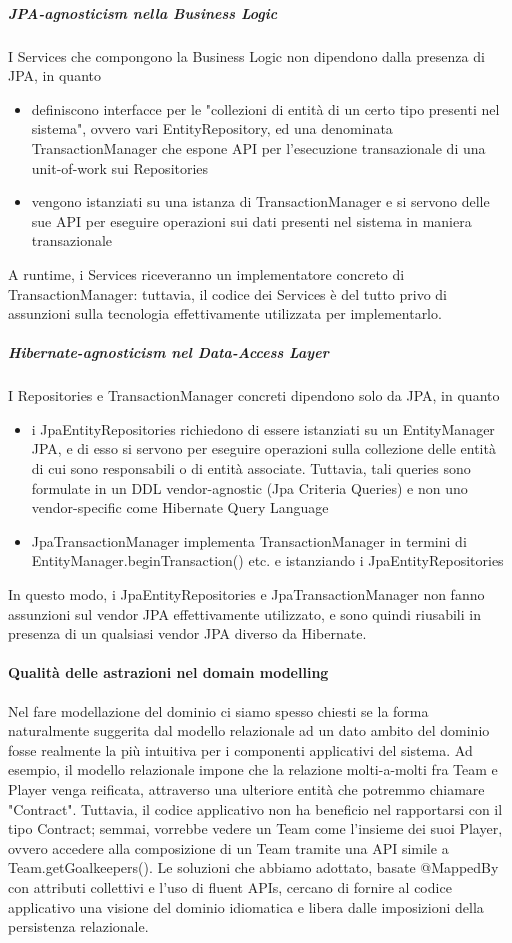 \subparagraph{JPA-agnosticism nella Business Logic}
I Services che compongono la Business Logic non dipendono dalla presenza di JPA, in quanto
\begin{itemize}
    \item definiscono interfacce per le "collezioni di entità di un certo tipo presenti nel sistema", ovvero vari EntityRepository, ed una denominata TransactionManager che espone API per l'esecuzione transazionale di una unit-of-work sui Repositories
    \item vengono istanziati su una istanza di TransactionManager e si servono delle sue API per eseguire operazioni sui dati presenti nel sistema in maniera transazionale
\end{itemize}
A runtime, i Services riceveranno un implementatore concreto di TransactionManager: tuttavia, il codice dei Services è del tutto privo di assunzioni sulla tecnologia  effettivamente utilizzata per implementarlo.

\subparagraph{Hibernate-agnosticism nel Data-Access Layer}
I Repositories e TransactionManager concreti dipendono solo da JPA, in quanto \begin{itemize}
    \item i JpaEntityRepositories richiedono di essere istanziati su un EntityManager JPA, e di esso si servono per eseguire operazioni sulla collezione delle entità di cui sono responsabili o di entità associate. Tuttavia, tali queries sono formulate in un DDL vendor-agnostic (Jpa Criteria Queries) e non uno vendor-specific come Hibernate Query Language
    \item JpaTransactionManager implementa TransactionManager in termini di  EntityManager.beginTransaction() etc. e istanziando i JpaEntityRepositories
\end{itemize}
In questo modo, i JpaEntityRepositories e JpaTransactionManager non fanno assunzioni  sul vendor JPA effettivamente utilizzato, e sono quindi riusabili in presenza di  un qualsiasi vendor JPA diverso da Hibernate.
    
\paragraph{Qualità delle astrazioni nel domain modelling} 
Nel fare modellazione del dominio ci siamo spesso chiesti se la forma naturalmente suggerita dal modello relazionale ad un dato ambito del dominio fosse realmente la più intuitiva per i componenti applicativi del sistema. Ad esempio, il modello relazionale impone che la relazione molti-a-molti fra Team e Player venga reificata, attraverso una ulteriore entità che potremmo chiamare "Contract". Tuttavia, il codice applicativo non ha beneficio nel rapportarsi con il tipo Contract; semmai, vorrebbe vedere un Team come l'insieme dei suoi Player, ovvero accedere alla composizione di un Team tramite una API simile a Team.getGoalkeepers(). Le soluzioni che abbiamo adottato, basate @MappedBy con attributi collettivi e l'uso di fluent APIs, cercano di fornire al codice applicativo una visione del dominio idiomatica e libera dalle imposizioni della persistenza relazionale.

